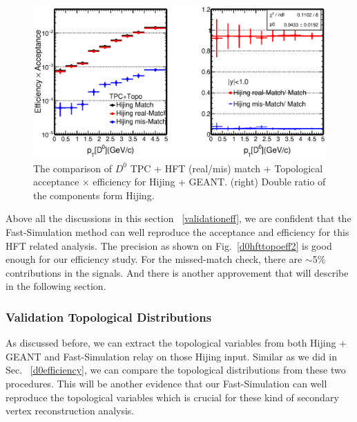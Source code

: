 \documentclass[a4paper]{article}
\begin{document}
\begin{figure}[htbp]
\centering
\includegraphics[keepaspectratio,width=1.0\textwidth,angle=0]{fig/ALL_Physics_FastHijingVsPureHijing_HFTTopo.eps}
\caption{The comparison of $D^0$ TPC + HFT (real/mis) match + Topological acceptance $\times$ efficiency for Hijing + GEANT. (right) Double ratio of the components form Hijing.}
\label{d0hfttopoAlleff}
\end{figure}

Above all the discussions in this section ~\ref{validationeff}, we are confident that the Fast-Simulation method can well reproduce the acceptance and efficiency for this HFT related analysis. The precision as shown on Fig.~\ref{d0hfttopoeff2} is good enough for our efficiency study. For the missed-match check, there are $\sim$5\% contributions in the signals. And there is another approvement that will describe in the following section.

\subsubsection{Validation Topological Distributions}
\label{validationTopo}

As discussed before, we can extract the topological variables from both Hijing + GEANT and Fast-Simulation relay on those Hijing input. Similar as we did in Sec. ~\ref{d0efficiency}, we can compare the topological distributions from these two procedures. This will be another evidence that our Fast-Simulation can well reproduce the topological variables which is crucial for these kind of secondary vertex reconstruction analysis.
\end{document}

